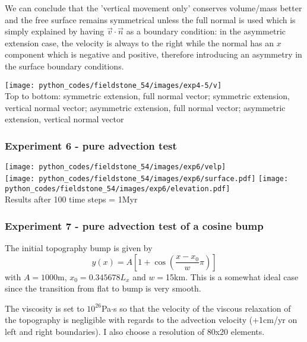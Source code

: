We can conclude that the 'vertical movement only' conserves volume/mass better and the free surface remains symmetrical unless the full normal is used which is simply explained by having $\vec{v}\cdot\vec{n}$ as a boundary condition: in the asymmetric extension case, the velocity is always to the right while the normal has an $x$ component which is negative and positive, therefore introducing an asymmetry in the surface boundary conditions.

\begin{center}
\texttt{[image: python\_codes/fieldstone\_54/images/exp4-5/v]}\\
{\captionfont Top to bottom: 
symmetric extension, full normal vector; 
symmetric extension, vertical normal vector; 
asymmetric extension, full normal vector; 
asymmetric extension, vertical normal vector}
\end{center}

\subsubsection*{Experiment 6 - pure advection test}

\begin{center}
\texttt{[image: python\_codes/fieldstone\_54/images/exp6/velp]}\\
\texttt{[image: python\_codes/fieldstone\_54/images/exp6/surface.pdf]}
\texttt{[image: python\_codes/fieldstone\_54/images/exp6/elevation.pdf]}\\
{\captionfont Results after 100 time steps = 1Myr}
\end{center}

\subsubsection*{Experiment 7 - pure advection test of a cosine bump}

The initial topography bump is given by
\[
y(x)=A \left[ 1+ \cos \left( \frac{x-x_0}{w} \pi \right) \right]
\]
with $A=1000$m, $x_0=0.345678L_x$ and $w=$15km. This is a somewhat ideal case 
since the transition from flat to bump is very smooth.

The viscosity is set to $10^{26}$Pa$\cdot$s so that the velocity of the 
viscous relaxation of the topography is negligible with regards to the advection velocity
(+1cm/yr on left and right boundaries). I also choose a resolution of 80x20 elements.

